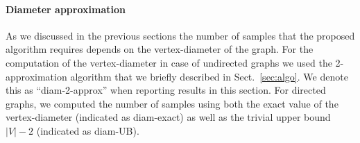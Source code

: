\paragraph{Diameter approximation}
As we discussed in the previous sections the number of samples that the proposed
algorithm requires depends on the vertex-diameter of the graph. 
For the computation of the vertex-diameter in case of undirected graphs we used
the 2-approximation algorithm that we briefly described in Sect.~\ref{sec:algo}.
We denote this as ``diam-2-approx'' when reporting results in this section. For
directed graphs, we computed the number of samples using both the exact value of
the vertex-diameter (indicated as diam-exact) as well as the trivial upper bound
$|V|-2$ (indicated as diam-UB). 



